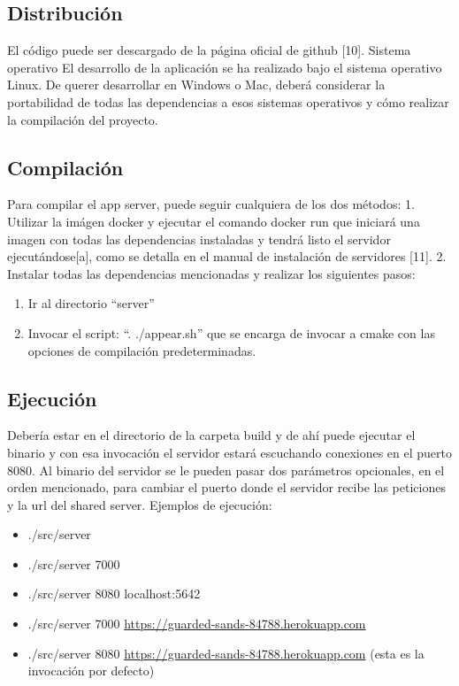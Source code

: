 \documentclass[a4paper,10pt,spanish]{sphinxmanual}
\begin{document}
\subsection{Distribución}
\label{docTecnica:distribucion}
El código puede ser descargado de la página oficial de github {[}10{]}.
Sistema operativo
El desarrollo de la aplicación se ha realizado bajo el sistema operativo Linux. De querer desarrollar en Windows o Mac, deberá considerar la portabilidad de todas las dependencias a esos sistemas operativos y cómo realizar la compilación del proyecto.


\subsection{Compilación}
\label{docTecnica:compilacion}
Para compilar el app server, puede seguir cualquiera de los dos métodos:
1. Utilizar la imágen docker y ejecutar el comando docker run que iniciará una imagen con todas las dependencias instaladas y tendrá listo el servidor ejecutándose{[}a{]}, como se detalla en el manual de instalación de servidores {[}11{]}.
2. Instalar todas las dependencias mencionadas y realizar los siguientes pasos:
\begin{enumerate}
\item {} 
Ir al directorio “server”

\item {} 
Invocar el script: “. ./appear.sh” que se encarga de invocar a cmake con las opciones de compilación predeterminadas.

\end{enumerate}


\subsection{Ejecución}
\label{docTecnica:ejecucion}
Debería estar en el directorio de la carpeta build y de ahí puede ejecutar el binario y con esa invocación el servidor estará escuchando conexiones en el puerto 8080. Al binario del servidor se le pueden pasar dos parámetros opcionales, en el orden mencionado, para cambiar el puerto donde el servidor recibe las peticiones y la url del shared server. Ejemplos de ejecución:
\begin{itemize}
\item {} 
./src/server

\item {} 
./src/server 7000

\item {} 
./src/server 8080 localhost:5642

\item {} 
./src/server 7000 \url{https://guarded-sands-84788.herokuapp.com}

\item {} 
./src/server 8080 \url{https://guarded-sands-84788.herokuapp.com} (esta es la invocación por defecto)

\end{itemize}
\end{document}
